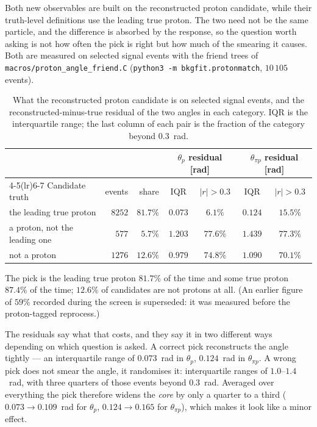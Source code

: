 Both new observables are built on the reconstructed proton candidate, while their truth-level
definitions use the leading true proton. The two need not be the same particle, and the difference
is absorbed by the response, so the question worth asking is not how often the pick is right but how
much of the smearing it causes. Both are measured on selected signal events with the friend trees of
\texttt{macros/proton\_angle\_friend.C} (\texttt{python3 -m bkgfit.protonmatch}, $10\,105$ events).

\begin{table}[H]
  \centering
  \caption{What the reconstructed proton candidate is on selected signal events, and the
    reconstructed-minus-true residual of the two angles in each category. IQR is the interquartile
    range; the last column of each pair is the fraction of the category beyond $0.3$~rad.}
  \label{tab:prmatch}
  \small
  \begin{tabular}{lrrcccc}
    \toprule
    & & & \multicolumn{2}{c}{$\theta_p$ residual [rad]} & \multicolumn{2}{c}{$\theta_{\pi p}$ residual [rad]} \\
    \cmidrule(lr){4-5}\cmidrule(lr){6-7}
    Candidate truth & events & share & IQR & $|r|>0.3$ & IQR & $|r|>0.3$ \\
    \midrule
    the leading true proton & $8252$ & $81.7\%$ & $0.073$ & $6.1\%$ & $0.124$ & $15.5\%$ \\
    a proton, not the leading one & $577$ & $5.7\%$ & $1.203$ & $77.6\%$ & $1.439$ & $77.3\%$ \\
    not a proton & $1276$ & $12.6\%$ & $0.979$ & $74.8\%$ & $1.090$ & $70.1\%$ \\
    \bottomrule
  \end{tabular}
\end{table}

The pick is the leading true proton $81.7\%$ of the time and some true proton $87.4\%$ of the time;
$12.6\%$ of candidates are not protons at all. (An earlier figure of $59\%$ recorded during the
screen is superseded: it was measured before the proton-tagged reprocess.)

The residuals say what that costs, and they say it in two different ways depending on which question
is asked. A correct pick reconstructs the angle tightly --- an interquartile range of $0.073$~rad in
$\theta_p$, $0.124$~rad in $\theta_{\pi p}$. A wrong pick does not smear the angle, it randomises
it: interquartile ranges of $1.0$--$1.4$~rad, with three quarters of those events beyond $0.3$~rad.
Averaged over everything the pick therefore widens the \emph{core} by only a quarter to a third
($0.073\to0.109$~rad for $\theta_p$, $0.124\to0.165$ for $\theta_{\pi p}$), which makes it look like
a minor effect.

